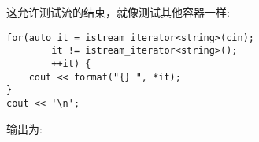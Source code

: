 这允许测试流的结束，就像测试其他容器一样:

\begin{lstlisting}[style=styleCXX]
for(auto it = istream_iterator<string>(cin);
		it != istream_iterator<string>();
		++it) {
	cout << format("{} ", *it);
}
cout << '\n';
\end{lstlisting}

输出为:


